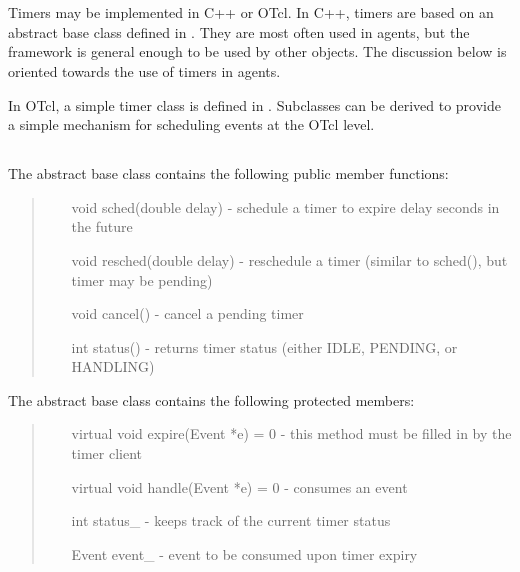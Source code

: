 %
\section{}

Timers may be implemented in C++ or OTcl.  In C++, timers are based on an 
abstract base class defined in .  They are most often 
used in agents, but the 
framework is general enough to be used by other objects.  The discussion
below is oriented towards the use of timers in agents.

In OTcl, a simple timer class is defined in .  
Subclasses can be derived to provide a simple mechanism for scheduling events 
at the OTcl level.

\subsection{}

The abstract base class  contains the following public member functions:
\begin{tt}
\begin{quote}
\begin{itemize}
\item[void sched(double delay)] - schedule a timer to expire delay seconds in the future
\item[void resched(double delay)] - reschedule a timer (similar to sched(), but
timer may be pending)
\item[void cancel()] - cancel a pending timer
\item[int status()] - returns timer status (either IDLE, PENDING, or HANDLING)
\end{itemize}
\end{quote}
\end{tt}

The abstract base class  contains the following protected members:
\begin{tt}
\begin{quote}
\begin{itemize}
\item[virtual void expire(Event *e) = 0] - this method must be filled in by the timer client
\item[virtual void handle(Event *e) = 0] - consumes an event 
\item[int status\_] - keeps track of the current timer status
\item[Event event\_] - event to be consumed upon timer expiry 
\end{itemize}
\end{quote}
\end{tt}

